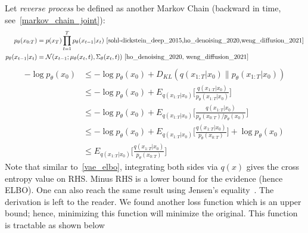 \documentclass{book}
\numberwithin{equation}{subsection}
\begin{document}
Let \textit{reverse process} be defined as another Markov Chain (backward in time, see~\ref{markov_chain_joint}):
\begin{align}
    p_\theta(x_{0:T}) &= p(x_T)\prod_{t=1}^T p_\theta(x_{t-1}|x_t)~\cite{sohl-dickstein_deep_2015,ho_denoising_2020,weng_diffusion_2021}\\
    p_\theta(x_{t-1}|x_t) &= \mathcal{N}(x_{t-1}; \mu_\theta(x_t, t), \Sigma_\theta(x_t,t))~\cite{ho_denoising_2020, weng_diffusion_2021}
\end{align}
\begin{align}
-\log p_\theta(x_0)
&\leq -\log p_\theta(x_0)+D_{KL}(q(x_{1:T}|x_0) \parallel p_\theta(x_{1:T}|x_0))\\
&\leq -\log p_\theta(x_0)+E_{q(x_{1:T}|x_0)}\Big[\frac{q(x_{1:T}|x_0)}{p_\theta(x_{1:T}|x_0)}\Big]\\
&\leq -\log p_\theta(x_0)+E_{q(x_{1:T}|x_0)}\Big[\frac{q(x_{1:T}|x_0)}{p_\theta(x_{0:T})/p_\theta(x_0)}\Big]\\
&\leq -\log p_\theta(x_0)+E_{q(x_{1:T}|x_0)}\Big[\frac{q(x_{1:T}|x_0)}{p_\theta(x_{0:T})}\Big]+\log p_\theta(x_0)\\
&\leq E_{q(x_{1:T}|x_0)}\Big[\frac{q(x_{1:T}|x_0)}{p_\theta(x_{0:T})}\Big]
\end{align}
Note that similar to~\ref{vae_elbo}, integrating both sides via $q(x)$ gives the cross entropy value on RHS. Minus RHS is a lower bound for the evidence (hence ELBO). One can also reach the same result using Jensen's equality~\cite{sohl-dickstein_deep_2015,weng_diffusion_2021}. The derivation is left to the reader. We found another loss function which is an upper bound; hence, minimizing this function will minimize the original. This function is tractable as shown below
\end{document}
